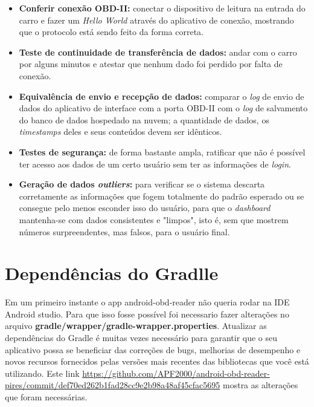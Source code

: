 \begin{itemize}
    \item \textbf{Conferir conexão OBD-II:} conectar o dispositivo de leitura na entrada do carro e fazer um \textit{Hello World} através do aplicativo de conexão, mostrando que o protocolo está sendo feito da forma correta.
    
    \item \textbf{Teste de continuidade de transferência de dados:} andar com o carro por alguns minutos e atestar que nenhum dado foi perdido por falta de conexão.
    
    \item \textbf{Equivalência de envio e recepção de dados:} comparar o \textit{log} de envio de dados do aplicativo de interface com a porta OBD-II com o \textit{log} de salvamento do banco de dados hospedado na nuvem; a quantidade de dados, os \textit{timestamps} deles e seus conteúdos devem ser idênticos. 
    
    \item \textbf{Testes de segurança:} de forma bastante ampla, ratificar que não é possível ter acesso aos dados de um certo usuário sem ter as informações de \textit{login}.
    
    \item \textbf{Geração de dados \textit{outliers}:} para verificar se o sistema descarta corretamente as informações que fogem totalmente do padrão esperado ou se consegue pelo menos esconder isso do usuário, para que o \textit{dashboard} mantenha-se com dados consistentes e "limpos", isto é, sem que mostrem números surpreendentes, mas falsos, para o usuário final.
    
\end{itemize}

\section{Dependências do Gradlle}

Em um primeiro instante o app android-obd-reader não queria rodar na IDE Android studio. Para que isso fosse possível foi necessario fazer alterações no arquivo \textbf{gradle/wrapper/gradle-wrapper.properties}. Atualizar as dependências do Gradle  é muitas vezes necessário para garantir que o seu aplicativo possa se beneficiar das correções de bugs, melhorias de desempenho e novos recursos fornecidos pelas versões mais recentes das bibliotecas que você está utilizando. Este link \url{https://github.com/APF2000/android-obd-reader-pires/commit/def70ed262b1fad28cc9e2b98a48af45cfac5695} mostra as alterações que foram necessárias.



